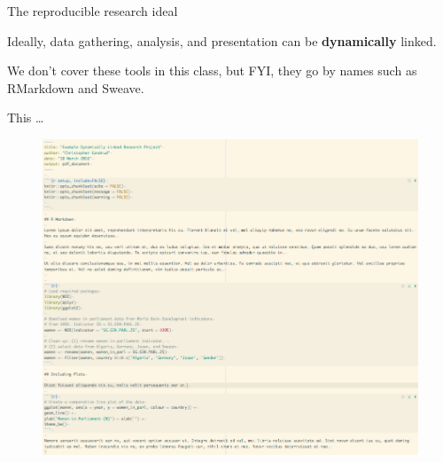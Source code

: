 \documentclass[10pt]{beamer}
\begin{document}
\begin{frame}{The reproducible research ideal}

    Ideally, data gathering, analysis, and presentation can be \textbf{dynamically} linked.

    \vspace{1cm}

    We don't cover these tools in this class, but FYI, they go by names such as RMarkdown and Sweave.

\end{frame}

\begin{frame}{This \ldots}

    \begin{figure}
            \includegraphics[scale=0.3]{img/rmarkdown_source.png}
    \end{figure}

\end{frame}
\end{document}
